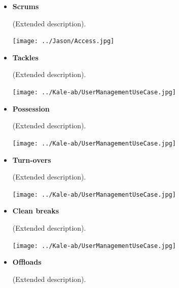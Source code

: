 \documentclass[a4paper,12pt]{report}
\begin{document}
{\begin{itemize}
\begin{itemize}
\begin{flushleft}
		(Extended description).
		\end{flushleft}
		\begin{center}
		\texttt{[image: ../Herman/Summaries.jpg]}\\[0.4cm]
		\end{center}
	\item \textbf{Scrums}
		\begin{flushleft}
		(Extended description).
		\end{flushleft}
		\begin{center}
		\texttt{[image: ../Jason/Access.jpg]}\\[0.4cm]
		\end{center}
	\item \textbf{Tackles}
		\begin{flushleft}
		(Extended description).
		\end{flushleft}
		\begin{center}
		\texttt{[image: ../Kale-ab/UserManagementUseCase.jpg]}\\[0.4cm]
		\end{center}
	\item \textbf{Possession}
		\begin{flushleft}
		(Extended description).
		\end{flushleft}
		\begin{center}
		\texttt{[image: ../Kale-ab/UserManagementUseCase.jpg]}\\[0.4cm]
		\end{center}
	\item \textbf{Turn-overs}
		\begin{flushleft}
		(Extended description).
		\end{flushleft}
		\begin{center}
		\texttt{[image: ../Kale-ab/UserManagementUseCase.jpg]}\\[0.4cm]
		\end{center}
	\item \textbf{Clean breaks}
		\begin{flushleft}
		(Extended description).
		\end{flushleft}
		\begin{center}
		\texttt{[image: ../Kale-ab/UserManagementUseCase.jpg]}\\[0.4cm]
		\end{center}
	\item \textbf{Offloads}
		\begin{flushleft}
		(Extended description).
		\end{flushleft}

\end{itemize}
\end{itemize}}
\end{document}
